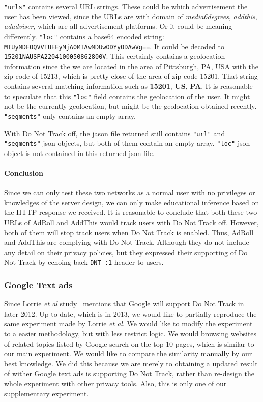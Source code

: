 \documentclass{sig-alternate}
\begin{document}
\verb|"urls"| contains several URL strings. These could be which advertisement the user has been viewed, since the URLs are with domain of \emph{media6degrees}, \emph{addthis}, \emph{adadviser}, which are all advertisement platforms. Or it could be meaning differently. \verb|"loc"| contains a base64 encoded string: \verb|MTUyMDFOQVVTUEEyMjA0MTAwMDUwODYyODAwVg==|. It could be decoded to \verb|15201NAUSPA2204100050862800V|. This certainly contains a geolocation information since the we are located in the area of Pittsburgh, PA, USA with the zip code of 15213, which is pretty close of the area of zip code 15201. That string contains several matching information such as \textbf{15201}, \textbf{US}, \textbf{PA}. It is reasonable to speculate that this \verb|"loc"| field contains the geolocation of the user. It might not be the currently geolocation, but might be the geolocation obtained recently. \verb|"segments"| only contains an empty array.

With Do Not Track off, the jason file returned still contains \verb|"url"| and \verb|"segments"| json objects, but both of them contain an empty array. \verb|"loc"| json object is not contained in this returned json file.

\paragraph{Conclusion}

Since we can only test these two networks as a normal user with no privileges or knowledges of the server design, we can only make educational inference based on the HTTP response we received. It is reasonable to conclude that both these two URLs of AdRoll and AddThis would track users with Do Not Track off. However, both of them will stop track users when Do Not Track is enabled. Thus, AdRoll and AddThis are complying with Do Not Track. Although they do not include any detail on their privacy policies, but they expressed their supporting of Do Not Track by echoing back \verb|DNT :1| header to users.

\subsubsection{Google Text ads}
Since Lorrie \emph{et al} study~\cite{balebako2012measuring} mentions that Google will support Do Not Track in later 2012. Up to date, which is in 2013, we would like to partially reproduce the same experiment made by Lorrie \emph{et al}. We would like to modify the experiment to a easier methodology, but with less restrict logic. We would browsing websites of related topics listed by Google search on the top 10 pages, which is similar to our main experiment. We would like to compare the similarity manually by our best knowledge. We did this because we are merely to obtaining a updated result of wither Google text ads is supporting Do Not Track, rather than re-design the whole experiment with other privacy tools. Also, this is only one of our supplementary experiment.
\end{document}
